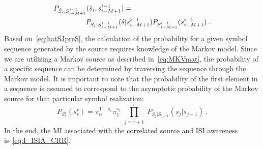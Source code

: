 \documentclass[journal]{IEEEtranTCOM}
\begin{document}
\begin{align}
    \begin{split}
    &P_{\hat{S}_i,S_{i-M+1}^{i-1}}(\hat{s}_i,s_{i-M+1}^{i-1}) =\\&\hspace{1.6cm} P_{\hat{S}_i|S_{i-M+1}^{i-1}}(\hat{s}|s_{i-M+1}^{i-1})P_{S_{i-M+1}^{i-1}}(s_{i-M+1}^{i-1})~.\label{eq:hatSJpreS}
\end{split}
\end{align}
Based on~\eqref{eq:hatSJpreS}, the calculation of the probability for a given symbol sequence generated by the source requires knowledge of the Markov model. Since we are utilizing a Markov source as described in~\eqref{eq:MKVmat}, the probability of a specific sequence can be determined by traversing the sequence through the Markov model. It is important to note that the probability of the first element in a sequence is assumed to correspond to the asymptotic probability of the Markov source for that particular symbol realization:
\begin{equation}
    P_{S_{r}^{v}}(s_{r}^{v}) = 
    \pi_{0}^{1-s_{r}} \pi_{1}^{s_{r}} \prod\limits_{\substack{j=r+1}}^{v} P_{S_{j}|S_{j-1}}(s_{j}|s_{j-1})~.
\end{equation}
In the end, the MI associated with the correlated source and ISI awareness is~\eqref{eq:I_ISIA_CRR}.
\end{document}
